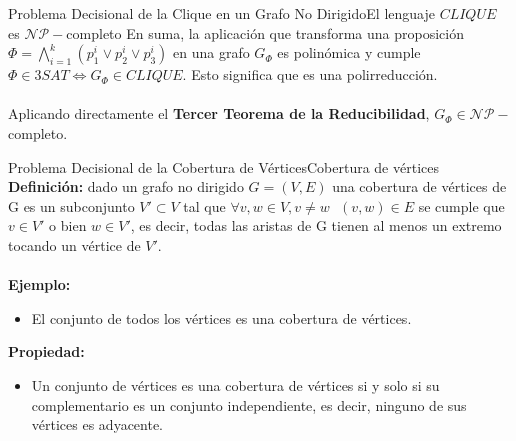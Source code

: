 \documentclass[10pt, envcountsect, presentation, aspectratio=169]{beamer}
\begin{document}
\begin{frame}{Problema Decisional de la Clique en un Grafo No Dirigido}{El lenguaje $CLIQUE$ es $\mathcal{NP}-$completo}
    En suma, la aplicación que transforma una proposición $\Phi=\bigwedge_{i=1}^k(p_1^i \vee p_2^i \vee p_3^i)$ en una grafo $G_\Phi$ es polinómica y cumple $\Phi \in 3SAT \Leftrightarrow G_\Phi \in CLIQUE$. Esto significa que es una polirreducción. \\~\\ 

    Aplicando directamente el \textbf{Tercer Teorema de la Reducibilidad}, $G_\Phi \in \mathcal{NP}-$completo. $\boxed{ }$
\end{frame}



\begin{frame}{Problema Decisional de la Cobertura de Vértices}{Cobertura de vértices}
    \textbf{Definición:} dado un grafo no dirigido $G=(V,E)$ una cobertura de vértices de G es un subconjunto  $V' \subset V$ tal que $\forall v, w \in V, v \neq w \text{ } (v,w)\in E$ se cumple que $v \in V'$ o bien $w\in V'$, es decir, todas las aristas de G tienen al menos un extremo tocando un vértice de $V'$.
     \\~\\

    \textbf{Ejemplo:}

    \begin{itemize}
        \item[] El conjunto de todos los vértices es una cobertura de vértices.
    \end{itemize}

    \textbf{Propiedad:}

    \begin{itemize}
        \item[] Un conjunto de vértices es una cobertura de vértices si y solo si su complementario es un conjunto independiente, es decir, ninguno de sus vértices es adyacente.
    \end{itemize}
    
\end{frame}


\end{document}
